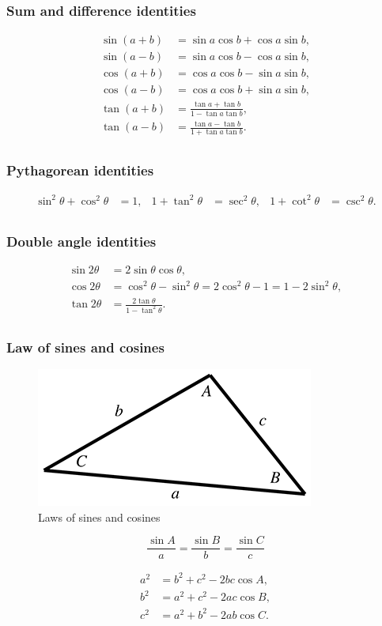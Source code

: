 \documentclass[11pt]{article}
\begin{document}
\subsubsection{Sum and difference identities}

\[\begin{matrix}
{\sin(a + b)} & {= \sin a\cos b + \cos a\sin b,} \\
{\sin(a - b)} & {= \sin a\cos b - \cos a\sin b,} \\
{\cos(a + b)} & {= \cos a\cos b - \sin a\sin b,} \\
{\cos(a - b)} & {= \cos a\cos b + \sin a\sin b,} \\
{\tan(a + b)} & {= \frac{\tan a + \tan b}{1 - \tan a\tan b},} \\
{\tan(a - b)} & {= \frac{\tan a - \tan b}{1 + \tan a\tan b}.} \\
\end{matrix}\]

\subsubsection{Pythagorean identities}

\[\begin{matrix}
{\sin^{2}\theta + \cos^{2}\theta} & {= 1,} & {1 + \tan^{2}\theta} & {= \sec^{2}\theta,} & {1 + \cot^{2}\theta} & {= \csc^{2}\theta.} \\
\end{matrix}\]

\subsubsection{Double angle identities}

\[\begin{matrix}
{\sin 2\theta} & {= 2\sin\theta\cos\theta,} \\
{\cos 2\theta} & {= \cos^{2}\theta - \sin^{2}\theta = 2\cos^{2}\theta - 1 = 1 - 2\sin^{2}\theta,} \\
{\tan 2\theta} & {= \frac{2\tan\theta}{1 - \tan^{2}\theta}.} \\
\end{matrix}\]

\subsubsection{Law of sines and cosines}

\begin{figure}[H]
\centering
    \includegraphics{01_laws}
\caption{Laws of sines and cosines}
\label{fig:laws-of-sines-and-cosines}
\end{figure}

$$\frac{\sin A}{a}=\frac{\sin B}{b}=\frac{\sin C}{c}$$

\begin{align*}
a^2 &= b^2 + c^2 - 2bc\cos A, \\
b^2 &= a^2 + c^2 - 2ac\cos B, \\
c^2 &= a^2 + b^2 - 2ab\cos C.
\end{align*}
\end{document}
